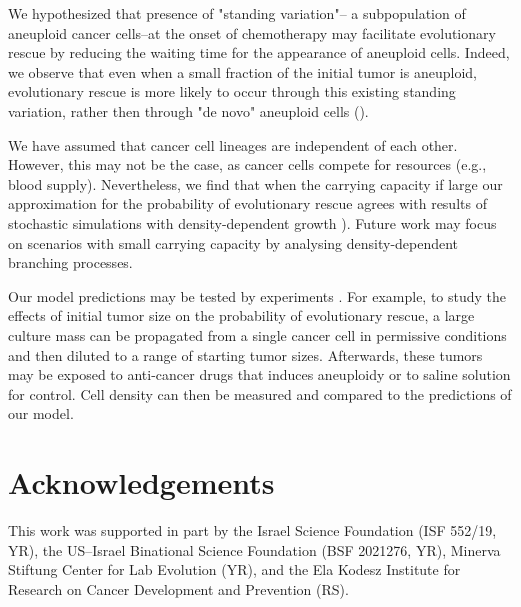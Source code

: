 \documentclass[12pt]{extarticle}
\begin{document}
We hypothesized that presence of "standing variation"-- %
a subpopulation of aneuploid cancer cells--at the onset of chemotherapy may facilitate evolutionary rescue by reducing the waiting time for the appearance of aneuploid cells. Indeed, we observe that even when a small fraction of the initial tumor is aneuploid, evolutionary rescue is more likely to occur through this existing standing variation, rather then through "de novo" aneuploid cells ().

We have assumed that cancer cell lineages are independent of each other. However, this may not be the case, as cancer cells compete for resources (e.g., blood supply). Nevertheless, we find that when the carrying capacity if large %
our approximation for the probability of evolutionary rescue agrees with results of stochastic simulations with density-dependent growth  ).
Future work may focus on scenarios with small carrying capacity by analysing density-dependent branching processes. %

Our model predictions may be tested by experiments \citep{martin2013probability}. For example, to study the effects of initial tumor size on the probability of evolutionary rescue, a large culture mass can be propagated from a single cancer cell in permissive conditions and then diluted to a  range of starting tumor sizes. Afterwards, these tumors may be exposed to anti-cancer drugs that induces aneuploidy %
or to saline solution for control. Cell density can then be measured and compared to the predictions of our model. %



{\small
\section*{Acknowledgements}
This work was supported in part by
the Israel Science Foundation (ISF 552/19, YR),
the US–Israel Binational Science Foundation (BSF 2021276, YR), 
Minerva Stiftung Center for Lab Evolution (YR), 
and the Ela Kodesz Institute for Research on Cancer Development and Prevention (RS).
}
\end{document}
